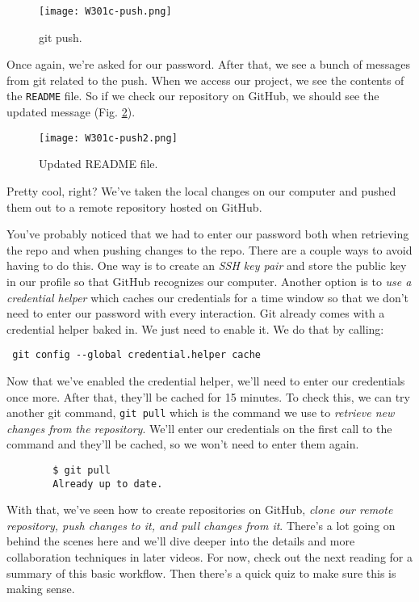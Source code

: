 	\begin{figure} 
		\caption{git push.}
		\centering
		\texttt{[image: W301c-push.png]}
		\label{W301c-push}
	\end{figure}
	
	Once again, we're asked for our password. After that, we see a bunch of messages from git related to the push. When we access our project, we see the contents of the \verb|README| file. So if we check our repository on GitHub, we should see the updated message (Fig. \ref{W301c-push2}).
	
	\begin{figure} 
		\caption{Updated README file.}
		\centering
		\texttt{[image: W301c-push2.png]}
		\label{W301c-push2}
	\end{figure}
	
	Pretty cool, right? We've taken the local changes on our computer and pushed them out to a remote repository hosted on GitHub. 
	
	You've probably noticed that we had to enter our password both when retrieving the repo and when pushing changes to the repo. There are a couple ways to avoid having to do this. One way is to create an \textit{SSH key pair} and store the public key in our profile so that GitHub recognizes our computer. Another option is to \textit{use a credential helper} which caches our credentials for a time window so that we don't need to enter our password with every interaction. Git already comes with a credential helper baked in. We just need to enable it. We do that by calling: 
	
	\verb| git config --global credential.helper cache |
	
	Now that we've enabled the credential helper, we'll need to enter our credentials once more. After that, they'll be cached for 15 minutes. 
	To check this, we can try another git command, \verb|git pull| which is the command we use to \textit{retrieve new changes from the repository}. We'll enter our credentials on the first call to the command and they'll be cached, so we won't need to enter them again.
	
	\begin{verbatim}
		$ git pull
		Already up to date.
	\end{verbatim}
	
	With that, we've seen how to create repositories on GitHub, \textit{clone our remote repository, push changes to it, and pull changes from it}. There's a lot going on behind the scenes here and we'll dive deeper into the details and more collaboration techniques in later videos. For now, check out the next reading for a summary of this basic workflow. Then there's a quick quiz to make sure this is making sense.


